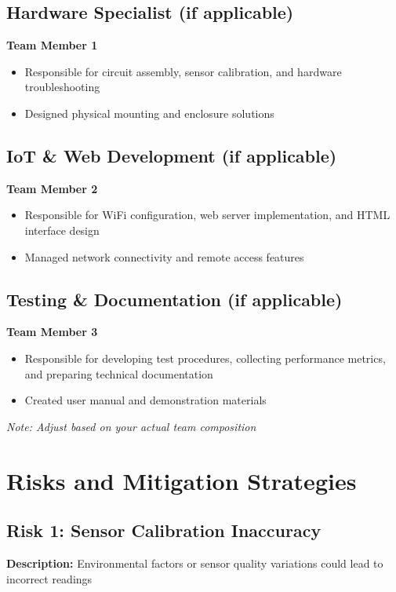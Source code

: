 \documentclass[12pt,a4paper]{article}
\begin{document}
\subsection{Hardware Specialist (if applicable)}
\textbf{Team Member 1}
\begin{itemize}
\item Responsible for circuit assembly, sensor calibration, and hardware troubleshooting
\item Designed physical mounting and enclosure solutions
\end{itemize}

\subsection{IoT \& Web Development (if applicable)}
\textbf{Team Member 2}
\begin{itemize}
\item Responsible for WiFi configuration, web server implementation, and HTML interface design
\item Managed network connectivity and remote access features
\end{itemize}

\subsection{Testing \& Documentation (if applicable)}
\textbf{Team Member 3}
\begin{itemize}
\item Responsible for developing test procedures, collecting performance metrics, and preparing technical documentation
\item Created user manual and demonstration materials
\end{itemize}

\textit{Note: Adjust based on your actual team composition}

\section{Risks and Mitigation Strategies}

\subsection{Risk 1: Sensor Calibration Inaccuracy}

\textbf{Description:} Environmental factors or sensor quality variations could lead to incorrect readings
\end{document}
